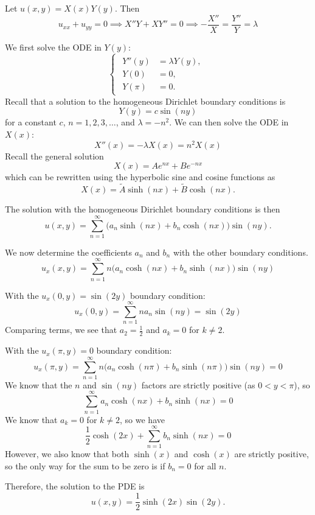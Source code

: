 \documentclass[plain]{pset}
\begin{document}
\begin{solution}
    Let \(u(x, y) = X(x)Y(y)\). Then
    \[u_{xx} + u_{yy} = 0 \implies X''Y + XY'' = 0 \implies -\frac{X''}{X} = \frac{Y''}{Y} = \lambda\]

    We first solve the ODE in \(Y(y)\):
    \[
        \begin{cases}
            \begin{aligned}
                Y''(y) &= \lambda Y(y), \\
                Y(0)                 & = 0, \\
                Y(\pi)               & = 0.
            \end{aligned}
        \end{cases}
    \]
    Recall that a solution to the homogeneous Dirichlet boundary conditions is
    \[Y(y) = c \sin(ny)\]
    for a constant \(c\), \(n = 1, 2, 3, \ldots\), and \(\lambda = -n^2\). We can then solve the ODE in \(X(x)\):
    \[X''(x) = -\lambda X(x) = n^2 X(x)\]
    Recall the general solution
    \[X(x) = Ae^{nx} + Be^{-nx}\]
    which can be rewritten using the hyperbolic sine and cosine functions as
    \[X(x) = \tilde{A}\sinh(nx) + \tilde{B}\cosh(nx).\]

    The solution with the homogeneous Dirichlet boundary conditions is then
    \[u(x, y) = \sum_{n=1}^\infty \bigl(a_n\sinh(nx) + b_n\cosh(nx)\bigr)\sin(ny).\]

    We now determine the coefficients \(a_n\) and \(b_n\) with the other boundary conditions.
    \[u_x(x, y) = \sum_{n=1}^\infty n\bigl(a_n\cosh(nx) + b_n\sinh(nx)\bigr)\sin(ny)\]

    With the \(u_x(0, y) = \sin(2y)\) boundary condition:
    \[u_x(0, y) = \sum_{n=1}^\infty n a_n \sin(ny) = \sin(2y)\]
    Comparing terms, we see that \(a_2 = \frac{1}{2}\) and \(a_k = 0\) for \(k \neq 2\).

    With the \(u_x(\pi, y) = 0\) boundary condition:
    \[u_x(\pi, y) = \sum_{n=1}^\infty n\bigl(a_n\cosh(n\pi) + b_n\sinh(n\pi)\bigr)\sin(ny) = 0\]
    We know that the \(n\) and \(\sin(ny)\) factors are strictly positive (as \(0 < y < \pi\)), so
    \[\sum_{n=1}^\infty a_n\cosh(nx) + b_n\sinh(nx) = 0\]
    We know that \(a_k = 0\) for \(k \neq 2\), so we have
    \[\frac{1}{2}\cosh(2x) + \sum_{n=1}^\infty b_n\sinh(nx) = 0\]
    However, we also know that both \(\sinh(x)\) and \(\cosh(x)\) are strictly positive, so the only way for the sum to be zero is if \(b_n = 0\) for all \(n\).

    Therefore, the solution to the PDE is
    \[u(x, y) = \frac{1}{2}\sinh(2x)\sin(2y).\]
\end{solution}
\end{document}
